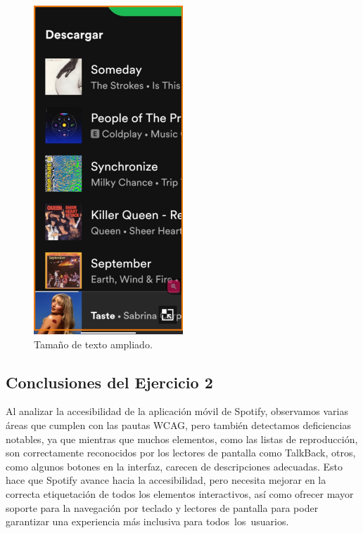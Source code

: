 \documentclass[letterpaper, 12pt]{report}
\begin{document}
\begin{figure}[H]
\centering
\includegraphics[width=0.5\textwidth]{figure30.png}
\caption{Tamaño de texto ampliado.}
\label{fig:30}
\end{figure}

\subsection{Conclusiones del Ejercicio 2}

Al analizar la accesibilidad de la aplicación móvil de Spotify, observamos varias áreas que cumplen con las pautas WCAG, pero también detectamos deficiencias notables, ya que mientras que muchos elementos, como las listas de reproducción, son correctamente reconocidos por los lectores de pantalla como TalkBack, otros, como algunos botones en la interfaz, carecen de descripciones adecuadas. Esto hace que Spotify avance hacia la accesibilidad, pero necesita mejorar en la correcta etiquetación de todos los elementos interactivos, así como ofrecer mayor soporte para la navegación por teclado y lectores de pantalla para poder  garantizar una experiencia más inclusiva para todos los usuarios.
                   
\end{document}
